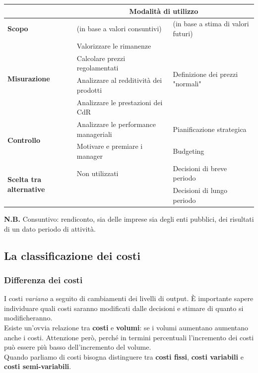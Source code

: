 \documentclass{article}
\begin{document}
\begin{center}
    \begin{tabular}{|l|m{5cm}|m{5cm}|}
        \hline
         & \multicolumn{2}{|c|}{\textbf{\color{synthwave_text}Modalità di utilizzo}}\\
        \hline
        \textbf{\color{synthwave_text}Scopo} & (in base a valori consuntivi) & (in base a stima di valori futuri)\\ \hline
        \multirow{4}{*}{\color{synthwave_text}\textbf{Misurazione}} & Valorizzare le rimanenze & \multirow{4}{*}{Definizione dei prezzi "normali"}\\
        & Calcolare prezzi regolamentati & \\
        & Analizzare al redditività dei prodotti & \\
        & Analizzare le prestazioni dei CdR &\\
        \hline
        \multirow{2}{*}{\color{synthwave_text}\textbf{Controllo}} & Analizzare le performance manageriali & Pianificazione strategica\\
        & Motivare e premiare i manager & Budgeting\\
        \hline 
        \multirow{2}{*}{\color{synthwave_text}\textbf{Scelta tra alternative}} & Non utilizzati & Decisioni di breve periodo\\
        & & Decisioni di lungo periodo\\
        \hline 
    \end{tabular}
\end{center}
\textbf{N.B.} Consuntivo: rendiconto, sia delle imprese sia degli enti pubblici, dei risultati di un dato periodo di attività.




\subsection{La classificazione dei costi}
\subsubsection{Differenza dei costi}
I costi \textit{variano} a seguito di cambiamenti dei livelli di output. È importante sapere individuare quali costi saranno modificati dalle decisioni e stimare di quanto si modificheranno.
\vspace*{0.2cm}\\
Esiste un'ovvia relazione tra \textbf{costi} e \textbf{volumi}: se i volumi aumentano aumentano anche i costi. Attenzione però, perché in termini percentuali l'incremento dei costi può essere più basso dell'incremento del volume.\\
Quando parliamo di costi bisogna distinguere tra \textbf{costi fissi}, \textbf{costi variabili} e \textbf{costi semi-variabili}.
\end{document}
